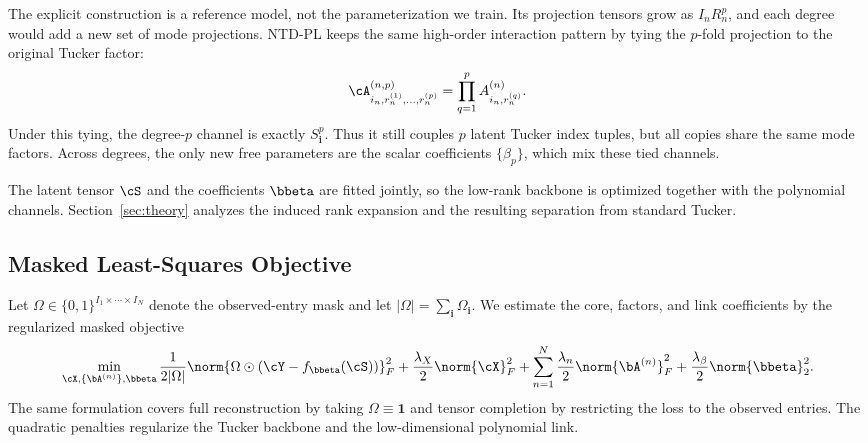 The explicit construction is a reference model, not the parameterization we
train. Its projection tensors grow as \(I_nR_n^p\), and each degree would add a
new set of mode projections. NTD-PL keeps the same high-order interaction
pattern by tying the \(p\)-fold projection to the original Tucker factor:
\[
  \cA^{(n,p)}_{i_n,r_n^{(1)},\ldots,r_n^{(p)}}
  =
  \prod_{q=1}^{p} A^{(n)}_{i_n,r_n^{(q)}} .
\]
Under this tying, the degree-\(p\) channel is exactly \(S_{\mathbf i}^{p}\).
Thus it still couples \(p\) latent Tucker index tuples, but all copies share
the same mode factors. Across degrees, the only new free parameters are the
scalar coefficients \(\{\beta_p\}\), which mix these tied channels.

The latent tensor \(\cS\) and the coefficients \(\bbeta\) are fitted jointly,
so the low-rank backbone is optimized together with the polynomial channels.
Section~\ref{sec:theory} analyzes the induced rank expansion and the resulting
separation from standard Tucker.

\subsection{Masked Least-Squares Objective}
\label{sec:masked-objective}

Let \(\Omega\in\{0,1\}^{I_1\times\cdots\times I_N}\) denote the observed-entry
mask and let \(|\Omega|=\sum_{\mathbf i}\Omega_{\mathbf i}\). We estimate the
core, factors, and link coefficients by the regularized masked objective
\begin{equation}
  \min_{\cX,\{\bA^{(n)}\},\bbeta}
  \frac{1}{2|\Omega|}
  \norm{
    \Omega \odot
    \left(\cY - f_{\bbeta}(\cS)\right)
  }_F^2
  +
  \frac{\lambda_X}{2}\norm{\cX}_F^2
  +
  \sum_{n=1}^{N}\frac{\lambda_n}{2}\norm{\bA^{(n)}}_F^2
  +
  \frac{\lambda_\beta}{2}\norm{\bbeta}_2^2.
\end{equation}
The same formulation covers full reconstruction by taking
\(\Omega\equiv\mathbf 1\) and tensor completion by restricting the loss to the
observed entries. The quadratic penalties regularize the Tucker backbone and
the low-dimensional polynomial link.

